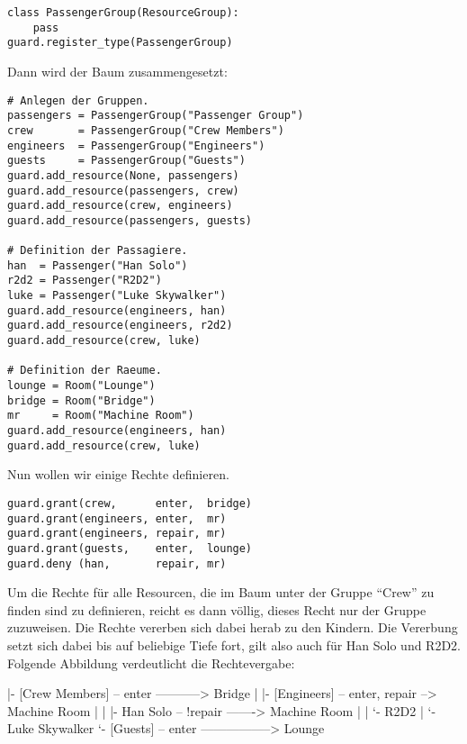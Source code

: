 \begin{lstlisting}
class PassengerGroup(ResourceGroup):
    pass
guard.register_type(PassengerGroup)
\end{lstlisting}

Dann wird der Baum zusammengesetzt:

\begin{lstlisting}
# Anlegen der Gruppen.
passengers = PassengerGroup("Passenger Group")
crew       = PassengerGroup("Crew Members")
engineers  = PassengerGroup("Engineers")
guests     = PassengerGroup("Guests")
guard.add_resource(None, passengers)
guard.add_resource(passengers, crew)
guard.add_resource(crew, engineers)
guard.add_resource(passengers, guests)

# Definition der Passagiere.
han  = Passenger("Han Solo")
r2d2 = Passenger("R2D2")
luke = Passenger("Luke Skywalker")
guard.add_resource(engineers, han)
guard.add_resource(engineers, r2d2)
guard.add_resource(crew, luke)

# Definition der Raeume.
lounge = Room("Lounge")
bridge = Room("Bridge")
mr     = Room("Machine Room")
guard.add_resource(engineers, han)
guard.add_resource(crew, luke)
\end{lstlisting}

Nun wollen wir einige Rechte definieren.

\begin{lstlisting}
guard.grant(crew,      enter,  bridge)
guard.grant(engineers, enter,  mr)
guard.grant(engineers, repair, mr)
guard.grant(guests,    enter,  lounge)
guard.deny (han,       repair, mr)
\end{lstlisting}

Um die Rechte für alle Resourcen, die im Baum unter der Gruppe ``Crew'' zu 
finden sind zu definieren, reicht es dann völlig, dieses Recht nur der 
Gruppe zuzuweisen. Die Rechte vererben sich dabei herab zu den Kindern. 
Die Vererbung setzt sich dabei bis auf beliebige Tiefe fort, gilt also auch 
für Han Solo und R2D2. Folgende Abbildung verdeutlicht die Rechtevergabe:


\begin{indentverb}
[Passengers]
  |- [Crew Members] -- enter -----------> Bridge
  |   |- [Engineers] -- enter, repair --> Machine Room
  |   |   |- Han Solo -- !repair -------> Machine Room
  |   |   `- R2D2
  |   `- Luke Skywalker
  `- [Guests] -- enter -----------------> Lounge
\end{indentverb}


